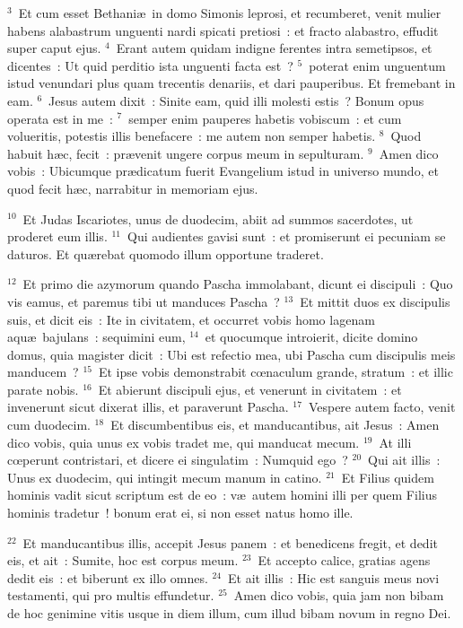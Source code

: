 ${}^{3}$~Et cum esset Bethani\ae\ in domo Simonis leprosi, et recumberet, venit mulier habens alabastrum unguenti nardi spicati pretiosi~: et fracto alabastro, effudit super caput ejus.
${}^{4}$~Erant autem quidam indigne ferentes intra semetipsos, et dicentes~: Ut quid perditio ista unguenti facta est~?
${}^{5}$~poterat enim unguentum istud venundari plus quam trecentis denariis, et dari pauperibus. Et fremebant in eam.
${}^{6}$~Jesus autem dixit~: Sinite eam, quid illi molesti estis~? Bonum opus operata est in me~:
${}^{7}$~semper enim pauperes habetis vobiscum~: et cum volueritis, potestis illis benefacere~: me autem non semper habetis.
${}^{8}$~Quod habuit h\ae c, fecit~: pr\ae venit ungere corpus meum in sepulturam.
${}^{9}$~Amen dico vobis~: Ubicumque pr\ae dicatum fuerit Evangelium istud in universo mundo, et quod fecit h\ae c, narrabitur in memoriam ejus.


${}^{10}$~Et Judas Iscariotes, unus de duodecim, abiit ad summos sacerdotes, ut proderet eum illis.
${}^{11}$~Qui audientes gavisi sunt~: et promiserunt ei pecuniam se daturos. Et qu\ae rebat quomodo illum opportune traderet.


${}^{12}$~Et primo die azymorum quando Pascha immolabant, dicunt ei discipuli~: Quo vis eamus, et paremus tibi ut manduces Pascha~?
${}^{13}$~Et mittit duos ex discipulis suis, et dicit eis~: Ite in civitatem, et occurret vobis homo lagenam aqu\ae\ bajulans~: sequimini eum,
${}^{14}$~et quocumque introierit, dicite domino domus, quia magister dicit~: Ubi est refectio mea, ubi Pascha cum discipulis meis manducem~?
${}^{15}$~Et ipse vobis demonstrabit cœnaculum grande, stratum~: et illic parate nobis.
${}^{16}$~Et abierunt discipuli ejus, et venerunt in civitatem~: et invenerunt sicut dixerat illis, et paraverunt Pascha.
${}^{17}$~Vespere autem facto, venit cum duodecim.
${}^{18}$~Et discumbentibus eis, et manducantibus, ait Jesus~: Amen dico vobis, quia unus ex vobis tradet me, qui manducat mecum.
${}^{19}$~At illi cœperunt contristari, et dicere ei singulatim~: Numquid ego~?
${}^{20}$~Qui ait illis~: Unus ex duodecim, qui intingit mecum manum in catino.
${}^{21}$~Et Filius quidem hominis vadit sicut scriptum est de eo~: v\ae\ autem homini illi per quem Filius hominis tradetur~! bonum erat ei, si non esset natus homo ille.


${}^{22}$~Et manducantibus illis, accepit Jesus panem~: et benedicens fregit, et dedit eis, et ait~: Sumite, hoc est corpus meum.
${}^{23}$~Et accepto calice, gratias agens dedit eis~: et biberunt ex illo omnes.
${}^{24}$~Et ait illis~: Hic est sanguis meus novi testamenti, qui pro multis effundetur.
${}^{25}$~Amen dico vobis, quia jam non bibam de hoc genimine vitis usque in diem illum, cum illud bibam novum in regno Dei.


